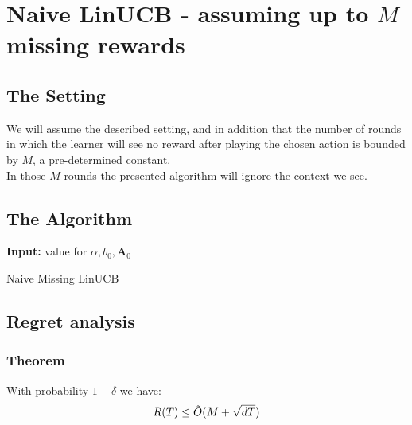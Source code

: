 \documentclass{article}
\begin{document}
\section{Naive LinUCB - assuming up to $M$ missing rewards}

\subsection{The Setting}
We will assume the described setting, and in addition that the number of rounds in which the learner will see no reward after playing the chosen action is bounded by $M$, a pre-determined constant.\\
In those $M$ rounds the presented algorithm will ignore the context we see. \\

\subsection{The Algorithm}

\begin{algorithm}[H]
\SetAlgoLined
 \textbf{Input:} value for $\alpha, b_0, \textbf{A}_0$ \\
    
 \caption{Naive Missing LinUCB}
\end{algorithm}

\subsection{Regret analysis}
\subsubsection{Theorem}

With probability $1- \delta$ we have: 
$$ R(T) \leq \Tilde{O} ( M + \sqrt{dT} ) $$
\end{document}
